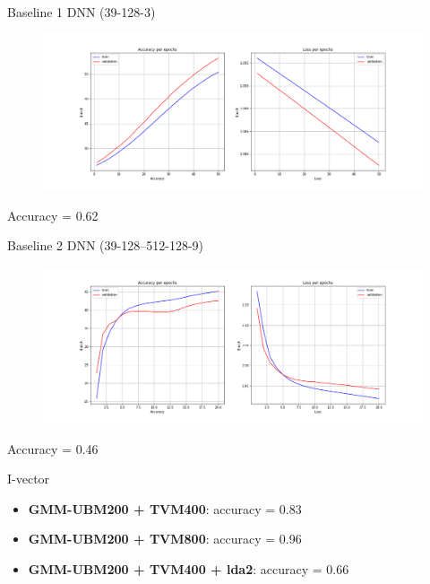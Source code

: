 \documentclass[xcolor=svgnames,handout]{beamer}
\begin{document}
  
  
\begin{frame}{Baseline 1}
  DNN (39-128-3)
  \begin{figure}[t]
    \centering
    \includegraphics[width = 1\linewidth]{results_dnn.png}
  \end{figure}
  Accuracy = 0.62
 \end{frame}
 
 
 \begin{frame}{Baseline 2}
  DNN (39-128--512-128-9)
  \begin{figure}[t]
    \centering
    \includegraphics[width = 1\linewidth]{results_dnn_512.png}
  \end{figure}
  Accuracy = 0.46
 \end{frame}

 \begin{frame}{I-vector}
  \begin{itemize}
      \item \textbf{GMM-UBM200 + TVM400}: accuracy = 0.83
      \item \textbf{GMM-UBM200 + TVM800}: accuracy = 0.96
      \item \textbf{GMM-UBM200 + TVM400 + lda2}: accuracy = 0.66
  \end{itemize}
 \end{frame}
\end{document}
